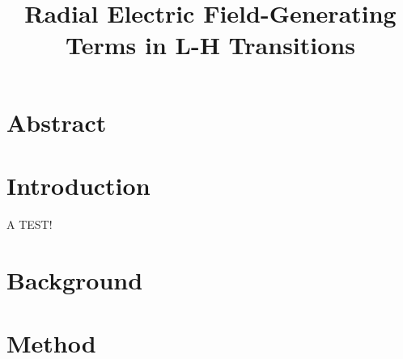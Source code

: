 \documentclass[a4paper,12pt]{report}
\title{Radial Electric Field-Generating Terms in L-H Transitions}
\author{\me}
\begin{document}



\normalsize

\chapter*{Abstract}\label{chapter:abstract}
%

\tableofcontents


\chapter{Introduction}\label{chapter:introduction}
\setcounter{page}{0}

A TEST!\cite{snipes_h_1996}


\clearemptydoublepage

\chapter{Background}\label{chapter:background}



\clearemptydoublepage

\chapter{Method}\label{chapter:method}


\clearemptydoublepage


\appendix
{}


\printbibliography
\end{document}
